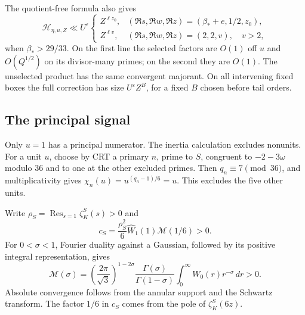 \documentclass[11pt,a4paper]{article}
\begin{document}
The quotient-free formula also gives \[
 \mathcal H_{\eta,u,Z}\ll U^\varepsilon
 \begin{cases}
 Z^{\ell z_0},&(\Re s,\Re w,\Re z)=(\beta_*+e,1/2,z_0),\\
 Z^{\ell v},&(\Re s,\Re w,\Re z)=(2,2,v),\quad v>2,
 \end{cases}
\tag{2.17}\label{eq:2.17}
\] when \(\beta_*>29/33\). On the first line the selected factors are \(O(1)\) off \(u\) and \(O(Q^{1/2})\) on its divisor-many primes; on the second they are \(O(1)\). The unselected product has the same convergent majorant. On all intervening fixed boxes the full correction has size \(U^\varepsilon Z^B\), for a fixed \(B\) chosen before tail orders.

\subsection{The principal signal}\label{sec:2.4}

Only \(u=1\) has a principal numerator. The inertia calculation excludes nonunits. For a unit \(u\), choose by CRT a primary \(n\), prime to \(S\), congruent to \(-2-3\omega\) modulo \(36\) and to one at the other excluded primes. Then \(q_n\equiv7\pmod{36}\), and multiplicativity gives \(\chi_n(u)=u^{(q_n-1)/6}=u\). This excludes the five other units.

Write \(\rho_S=\operatorname{Res}_{s=1}\zeta_K^S(s)>0\) and \[
 c_S=\frac{\rho_S^2}{6}\widehat W_1(1)\mathscr M(1/6)>0.
\tag{2.18}\label{eq:2.18}
\] For \(0<\sigma<1\), Fourier duality against a Gaussian, followed by its positive integral representation, gives \[
 \mathscr M(\sigma)=\left(\frac{2\pi}{\sqrt3}\right)^{1-2\sigma}
 \frac{\Gamma(\sigma)}{\Gamma(1-\sigma)}
 \int_0^\infty W_0(r)r^{-\sigma}\,dr>0.
\] Absolute convergence follows from the annular support and the Schwartz transform. The factor \(1/6\) in \(c_S\) comes from the pole of \(\zeta_K^S(6z)\).
\end{document}
